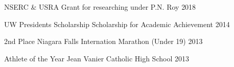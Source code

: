 

\begin{cvhonors}

  \cvhonor
    {NSERC \& USRA} %
    {Grant for researching under P.N. Roy} %
    {} %
    {2018} %

  \cvhonor
    {UW Presidents Scholarship} %
    {Scholarship for Academic Achievement} %
    {} %
    {2014} %

\end{cvhonors}



\begin{cvhonors}

  \cvhonor
    {2nd Place} %
    {Niagara Falls Internation Marathon (Under 19)} %
    {} %
    {2013} %

  \cvhonor
    {Athlete of the Year} %
    {Jean Vanier Catholic High School} %
    {} %
    {2013} %

\end{cvhonors}